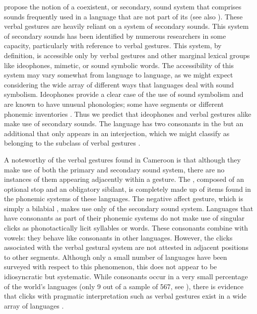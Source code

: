 \documentclass[output=paper
,newtxmath
,modfonts
,nonflat]{langsci/langscibook}
\begin{document}
\citet{friespike} propose the notion of a coexistent, or secondary, sound system that comprises sounds frequently used in a language that are not part of its  (see also \citealt{harris1951}). These verbal gestures are heavily reliant on a system of secondary sounds. This system of secondary sounds has been identified by numerous researchers in some capacity, particularly with reference to verbal gestures. This system, by definition, is accessible only by verbal gestures and other marginal lexical groups like ideophones, mimetic, or sound symbolic words. The accessibility of this system may vary somewhat from language to language, as we might expect considering the wide array of different ways that languages deal with sound symbolism. Ideophones provide a clear case of the use of sound symbolism and are known to have unusual phonologies; some have segments or different phonemic inventories \citep[181-185]{childs1994}.  Thus we predict that ideophones and verbal gestures alike make use of secondary sounds. The  language  has two  consonants in the  but an additional  that only appears in an interjection, which we might classify as belonging to the subclass of verbal gestures \citep[130]{BostoenSands2012}.

A noteworthy  of the verbal gestures found in Cameroon is that although they make use of both the primary and secondary sound system, there are no instances of them appearing adjacently within a gesture. The , composed of an optional stop and an obligatory sibilant, is completely made up of items found in the phonemic systems of these languages. The negative affect gesture, which is simply a bilabial , makes use only of the secondary sound system. Languages that have  consonants as part of their phonemic systems do not make use of singular clicks as phonotactically licit syllables or words. These consonants combine with vowels: they behave like consonants in other languages. However, the clicks associated with the verbal gestural system are not attested in adjacent positions to other segments. Although only a small number of languages have been surveyed with respect to this phenomenon, this does not appear to be idiosyncratic but systematic. While  consonants occur in a very small percentage of the world's languages (only 9 out of a sample of 567, see \citealt{wals-19}), there is evidence that clicks with pragmatic interpretation such as verbal gestures exist in a wide array of languages \citep{wals-142}. %
\end{document}

